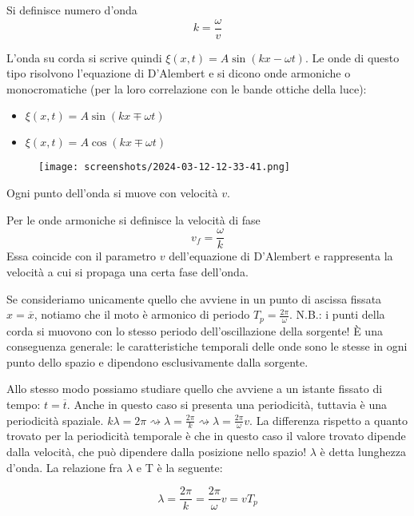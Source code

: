 \begin{definition}
	Si definisce numero d'onda
	\[
		k = \frac{\omega }{v}
	\]
\end{definition}

L'onda su corda si scrive quindi \(\xi (x,t) = A \sin (kx - \omega t)\). Le onde di questo tipo risolvono l'equazione di D'Alembert e si dicono onde armoniche o monocromatiche (per la loro correlazione con le bande ottiche della luce):
\begin{itemize}
	\item \(\xi (x,t) = A \sin (kx \mp \omega t)\)
	\item \(\xi (x,t) = A \cos (kx \mp \omega t)\)  
\end{itemize}
\begin{figure}[H]
	\centering
	\texttt{[image: screenshots/2024-03-12-12-33-41.png]}
\end{figure}
Ogni punto dell'onda si muove con velocità \(v\).
\begin{definition}
	\label{def:v_phase}
	Per le onde armoniche si definisce la velocità di fase
	\[
		v_f = \frac{\omega }{k}
	\]
	Essa coincide con il parametro \(v\) dell'equazione di D'Alembert e rappresenta la velocità a cui si propaga una certa fase dell'onda.
\end{definition}
Se consideriamo unicamente quello che avviene in un punto di ascissa fissata \(x=\overline{x} \), notiamo che il moto è armonico di periodo \(T_p = \frac{2\pi }{\omega }\). N.B.: i punti della corda si muovono con lo stesso periodo dell'oscillazione della sorgente! È una conseguenza generale: le caratteristiche temporali delle onde sono le stesse in ogni punto dello spazio e dipendono esclusivamente dalla sorgente.

Allo stesso modo possiamo studiare quello che avviene a un istante fissato di tempo: \(t=\overline{t} \). Anche in questo caso si presenta una periodicità, tuttavia è una periodicità spaziale. \(k \lambda = 2\pi \rightsquigarrow \lambda = \frac{2\pi }{k} \rightsquigarrow \lambda = \frac{2 \pi }{\omega } v\). La differenza rispetto a quanto trovato per la periodicità temporale è che in questo caso il valore trovato dipende dalla velocità, che può dipendere dalla posizione nello spazio! \(\lambda \) è detta lunghezza d'onda. La relazione fra \(\lambda \) e T è la seguente:
\begin{definition}
	\[
		\lambda = \frac{2 \pi }{k}= \frac{2\pi }{\omega }v= vT_p
	\]
\end{definition}

